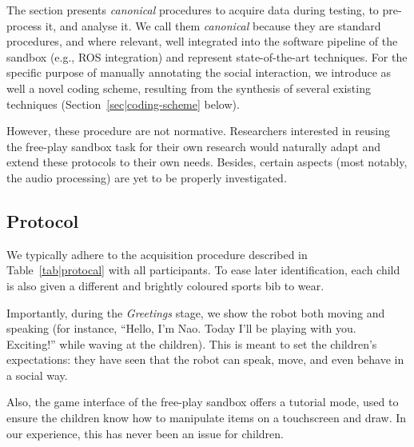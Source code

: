 \documentclass[sigconf]{acmart}
\newcommand{\eg}{e.g.,\xspace}
\begin{document}
The section presents \emph{canonical} procedures to acquire data during testing,
to pre-process it, and analyse it. We call them \emph{canonical} because they
are standard procedures, and where relevant, well integrated into the software pipeline of the sandbox (\eg ROS
integration) and represent state-of-the-art techniques. For the specific purpose
of manually annotating the social interaction, we introduce as well a novel
coding scheme, resulting from the synthesis of several existing techniques
(Section~\ref{sec|coding-scheme} below).

However, these procedure are not normative. Researchers interested in
reusing the free-play sandbox task for their own research would naturally adapt
and extend these protocols to their own needs. Besides, certain aspects (most
notably, the audio processing) are yet to be properly investigated.

\subsection{Protocol}

We typically adhere to the acquisition procedure described in
Table~\ref{tab|protocal} with all participants.  To ease later identification,
each child is also given a different and brightly coloured sports bib to wear.

Importantly, during the \emph{Greetings} stage, we show the robot both moving and
speaking (for instance, ``Hello, I'm Nao. Today I'll be playing with you.
Exciting!'' while waving at the children). This is meant to set the children's
expectations: they have seen that the robot can speak, move, and even behave in
a social way.

Also, the game interface of the free-play sandbox offers a tutorial mode, used
to ensure the children know how to manipulate items on a touchscreen and draw.
In our experience, this has never been an issue for children.


\newcommand{\tabitem}{~~\llap{\textbullet}~~}
\end{document}
